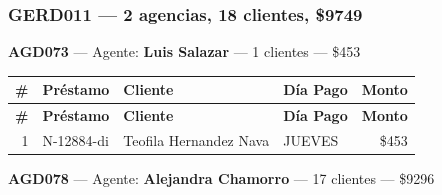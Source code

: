 \documentclass[11pt,a4paper]{article}
\newcommand{\money}[1]{\$\num{#1}}
\begin{document}
\subsubsection{GERD011 --- 2 agencias, 18 clientes, \money{9749}}

\noindent\textbf{AGD073} --- Agente: \textbf{Luis Salazar} --- 1 clientes --- \money{453}


\begin{center}
\renewcommand{\arraystretch}{1.1}
\footnotesize
\begin{longtable}{rlp{6.5cm}lr}
\toprule
\textbf{\#} & \textbf{Pr\'estamo} & \textbf{Cliente} & \textbf{D\'ia Pago} & \textbf{Monto} \\
\midrule
\endfirsthead
\toprule
\textbf{\#} & \textbf{Pr\'estamo} & \textbf{Cliente} & \textbf{D\'ia Pago} & \textbf{Monto} \\
\midrule
\endhead
1 & N-12884-di & Teofila Hernandez Nava & JUEVES & \money{453} \\

\bottomrule
\end{longtable}
\end{center}
\noindent\textbf{AGD078} --- Agente: \textbf{Alejandra Chamorro} --- 17 clientes --- \money{9296}
\end{document}
